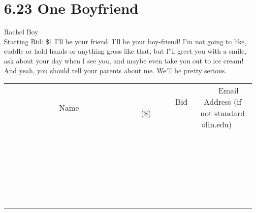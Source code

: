 \documentclass[11pt]{article}
\begin{document}
\section*{6.23 One Boyfriend}
Rachel Boy
\\
Starting Bid: \$1
\newline
I'll be your friend.  I'll be your boy-friend!  I'm not going to like, cuddle or hold hands or anything gross like that, but I"ll greet you with a smile, ask about your day when I see you, and maybe even take you out to ice cream! And yeah, you should tell your parents about me.  We'll be pretty serious.
\\[6ex]
\begin{tabular}{c c c}
~~~~~~~~~~~~~Name~~~~~~~~~~~~~ & ~~~~~~~~~Bid (\$)~~~~~~~~~  & ~~~Email Address (if not standard olin.edu)~~~\\
 & & \\
\hline
 & & \\
\hline
 & & \\
\hline
 & & \\
\hline
 & & \\
\hline
 & & \\
\hline
 & & \\
\hline
 & & \\
\hline
 & & \\
\hline
 & & \\
\hline
 & & \\
\hline
 & & \\
\hline
 & & \\
\hline
 & & \\
\hline
 & & \\
\hline
 & & \\
\hline
 & & \\
\hline
 & & \\
\hline
 & & \\
\hline
 & & \\
\hline
 & & \\
\hline
 & & \\
\hline
 & & \\
\hline
 & & \\
\hline
 & & \\
\hline
 & & \\
\hline
\end{tabular}
\newpage
\end{document}
